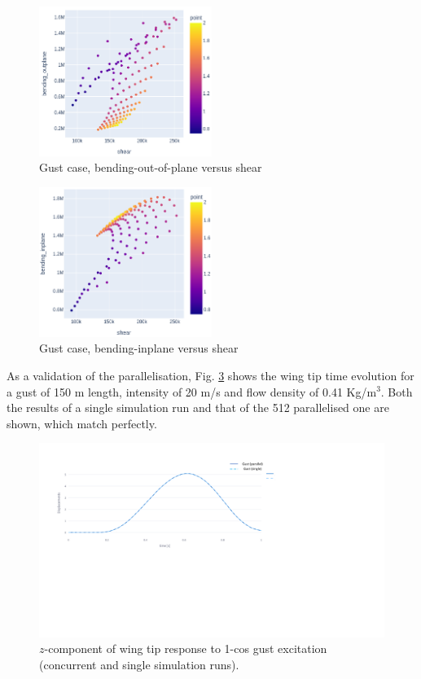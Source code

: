 \documentclass[11pt]{article}
\begin{document}
\begin{figure}[htbp]
\centering
\includegraphics[width=0.5\textwidth]{figs/gust_bendingout_shear.png}
\caption{\label{fig:org2cc043d}Gust case, bending-out-of-plane versus shear}
\end{figure}

\begin{figure}[htbp]
\centering
\includegraphics[width=0.5\textwidth]{figs/gust_bendingin_shear.png}
\caption{\label{fig:org15e0bb1}Gust case, bending-inplane versus shear}
\end{figure}

As a validation of the parallelisation, Fig. \ref{fig:orgc341d05} shows the wing tip time evolution for a gust of 150 m length, intensity of 20 m/s and flow density of 0.41 Kg/m\(^3\). Both the results of a single simulation run and that of the 512 parallelised one are shown, which match perfectly.

\begin{figure}[htbp]
\centering
\includegraphics[width=1\textwidth]{figs/bug_gusttip.pdf}
\caption{\label{fig:orgc341d05}\(z\)-component of wing tip response to 1-cos gust excitation (concurrent and single simulation runs).}
\end{figure}
\end{document}
